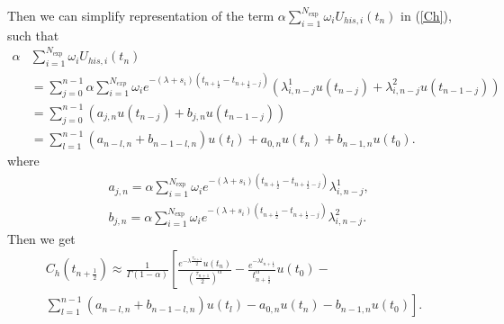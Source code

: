 \documentclass[10pt, reqno]{amsart}
\theoremstyle{remark}
\theoremstyle{definition}
\numberwithin{table}{section}
\begin{document}
Then we can simplify representation of the term $\alpha \sum_{i=1}^{N_{\text {exp }}} \omega_i U_{h i s,  i}\left(t_n\right)$ in (\ref{Ch}), such that
\begin{equation}
\begin{aligned}
\alpha &\sum_{i=1}^{N_{\text {exp }}} \omega_i U_{h i s,  i}\left(t_n\right) \\
& =\sum_{j=0}^{n-1} \alpha \sum_{i=1}^{N_{e x p}} \omega_i e^{-\left(\lambda+s_i\right)\left(t_{n+\frac{1}{2}}-t_{{n+\frac{1}{2}}-j}\right)}\left(\lambda_{i,  n-j}^1 u(t_{n-j})+\lambda_{i,  n-j}^2 u(t_{n-1-j})\right) \\
& =\sum_{j=0}^{n-1}\left(a_{j,  n} u(t_{n-j})+b_{j,  n} u(t_{n-1-j})\right)\\
&=\sum_{l=1}^{n-1}(a_{n-l, n}+b_{n-1-l, n})u(t_l)+a_{0, n}u(t_{n})+b_{n-1, n}u(t_0). 
\end{aligned}
\end{equation}
where
\begin{equation}\label{ab}
\begin{aligned}
&a_{j,  n}=\alpha \sum_{i=1}^{N_{\exp }} \omega_i e^{-\left(\lambda+s_i\right)\left(t_{n+\frac{1}{2}}-t_{{n+\frac{1}{2}}-j}\right)} \lambda_{i,  n-j}^1,  \\
&b_{j,  n}=\alpha \sum_{i=1}^{N_{\exp }} \omega_i e^{-\left(\lambda+s_i\right)\left(t_{n+\frac{1}{2}}-t_{{n+\frac{1}{2}}-j}\right)} \lambda_{i,  n-j}^2. 
\end{aligned}
\end{equation}
Then we get
$$
\begin{aligned}
    C_h(t_{n+\frac{1}{2}}) \approx \frac{1}{\Gamma(1-\alpha)}\left[\frac{e^{-\lambda \frac{\tau_{n+1}}{2}} u\left(t_{n}\right)}{(\frac{\tau_{n+1}}{2})^\alpha}-\frac{e^{-\lambda t_{n+\frac{1}{2}}}}{t_{n+\frac{1}{2}}^\alpha} u\left(t_0\right)-\right. \\
    \left. \sum_{l=1}^{n-1}(a_{n-l, n}+b_{n-1-l, n})u(t_l)-a_{0, n}u(t_{n})-b_{n-1, n}u(t_0)\right]. 
\end{aligned}
$$
\end{document}
